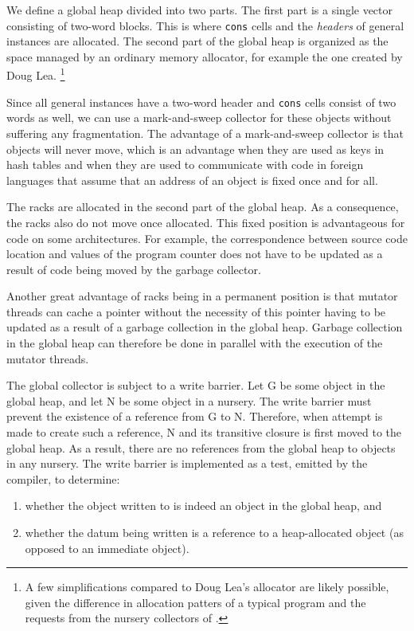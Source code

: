 We define a global heap divided into two parts.  The first part is a
single vector consisting of two-word blocks.  This is where
\texttt{cons} cells and the \emph{headers} of general instances are
allocated.  The second part of the global heap is organized as the
space managed by an ordinary memory allocator, for example the one
created by Doug Lea.%
\footnote{A few simplifications compared to Doug Lea's allocator are
  likely possible, given the difference in allocation patters of a
  typical \clanguage{} program and the requests from the nursery
  collectors of \sysname{}.}

Since all general instances have a two-word header and \texttt{cons}
cells consist of two words as well, we can use a mark-and-sweep
collector for these objects without suffering any fragmentation.  The
advantage of a mark-and-sweep collector is that objects will never
move, which is an advantage when they are used as keys in hash tables
and when they are used to communicate with code in foreign languages
that assume that an address of an object is fixed once and for all.

The racks are allocated in the second part of the global heap.  As a
consequence, the racks also do not move once allocated.  This
fixed position is advantageous for code on some architectures.  For
example, the correspondence between source code location and values of
the program counter does not have to be updated as a result of code
being moved by the garbage collector.

Another great advantage of racks being in a permanent position is that
mutator threads can cache a pointer without the necessity of this
pointer having to be updated as a result of a garbage collection in
the global heap.  Garbage collection in the global heap can therefore
be done in parallel with the execution of the mutator threads.

The global collector is subject to a write barrier.  Let G be some
object in the global heap, and let N be some object in a nursery.  The
write barrier must prevent the existence of a reference from G to N.
Therefore, when attempt is made to create such a reference, N and its
transitive closure is first moved to the global heap.  As a result,
there are no references from the global heap to objects in any
nursery.  The write barrier is implemented as a test, emitted by the
compiler, to determine:

\begin{enumerate}
\item whether the object written to is indeed an object in the global
  heap, and
\item whether the datum being written is a reference to a
  heap-allocated object (as opposed to an immediate object).
\end{enumerate}

